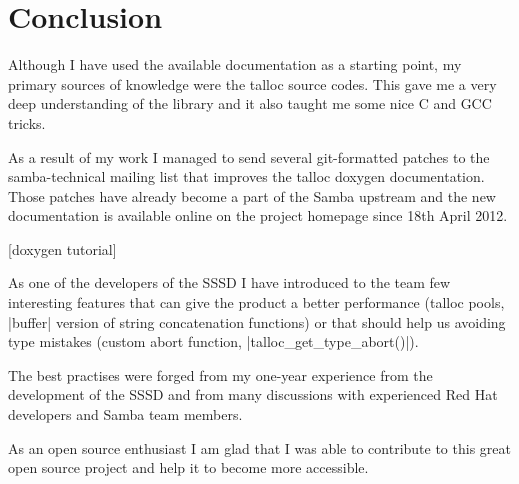 \chapter{Conclusion}

Although I have used the available documentation as a starting point, my primary
sources of knowledge were the talloc source codes. This gave me a very deep
understanding of the library and it also taught me some nice C and GCC tricks.

As a result of my work I managed to send several git-formatted patches to the
samba-technical mailing list that improves the talloc doxygen documentation.
Those patches have already become a part of the Samba upstream and the new
documentation is available online on the project homepage since 18th April 2012.

[doxygen tutorial]

As one of the developers of the SSSD I have introduced to the team few
interesting features that can give the product a better performance (talloc
pools, |buffer| version of string concatenation functions) or that should help
us avoiding type mistakes (custom abort function, |talloc_get_type_abort()|).

The best practises were forged from my one-year experience from the development
of the SSSD and from many discussions with experienced Red Hat developers and
Samba team members.

As an open source enthusiast I am glad that I was able to contribute to this
great open source project and help it to become more accessible.


% 
